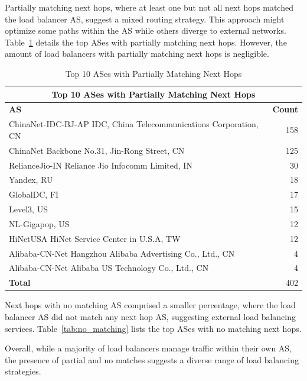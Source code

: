 \documentclass[12pt]{cwru_thesis}
\begin{document}
Partially matching next hops, where at least one but not all next hops matched the load balancer AS, suggest a mixed routing strategy. This approach might optimize some paths within the AS while others diverge to external networks. Table~\ref{tab:partially_matching} details the top ASes with partially matching next hops. However, the amount of load balancers with partially matching next hops is negligible. 
\newpage

\begin{table}[h!]
    \centering
    \begin{tabular}{|l|r|}
        \hline
        \multicolumn{2}{|c|}{\textbf{Top 10 ASes with Partially Matching Next Hops}} \\
        \hline
        \textbf{AS} & \textbf{Count} \\
        \hline
        ChinaNet-IDC-BJ-AP IDC, China Telecommunications Corporation, CN & 158 \\
        ChinaNet Backbone No.31, Jin-Rong Street, CN & 125 \\
        RelianceJio-IN Reliance Jio Infocomm Limited, IN & 30 \\
        Yandex, RU & 18 \\
        GlobalDC, FI & 17 \\
        Level3, US & 15 \\
        NL-Gigapop, US & 12 \\
        HiNetUSA HiNet Service Center in U.S.A, TW & 12 \\
        Alibaba-CN-Net Hangzhou Alibaba Advertising Co., Ltd., CN & 4 \\
        Alibaba-CN-Net Alibaba US Technology Co., Ltd., CN & 4 \\
        \hline
        \textbf{Total} & 402 \\
        \hline
    \end{tabular}
    \caption{Top 10 ASes with Partially Matching Next Hops}
    \label{tab:partially_matching}
\end{table}

Next hops with no matching AS comprised a smaller percentage, where the load balancer AS did not match any next hop AS, suggesting external load balancing services. Table~\ref{tab:no_matching} lists the top ASes with no matching next hops.

Overall, while a majority of load balancers manage traffic within their own AS, the presence of partial and no matches suggests a diverse range of load balancing strategies.
\end{document}
